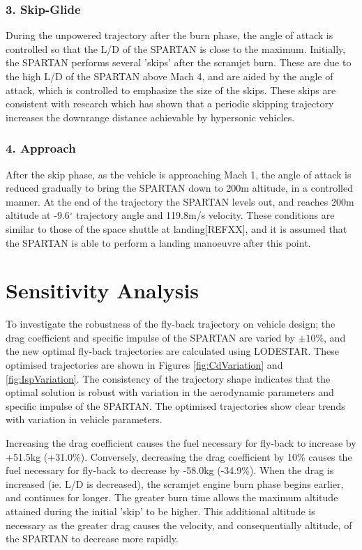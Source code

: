 \documentclass[conf]{new-aiaa}
\begin{document}
\subsubsection{3. Skip-Glide}
During the unpowered trajectory after the burn phase, the angle of attack is controlled so that the L/D of the SPARTAN is close to the maximum. Initially, the SPARTAN performs several 'skips' after the scramjet burn. These are due to the high L/D of the SPARTAN above Mach 4, and are aided by the angle of attack, which is controlled to emphasize the size of the skips. These skips are consistent with research which has shown that a periodic skipping trajectory increases the downrange distance achievable by hypersonic vehicles\cite{Eggers1957,Kanda2007}. 


\subsubsection{4. Approach}
After the skip phase, as the vehicle is approaching Mach 1, the angle of attack is reduced gradually to bring the SPARTAN down to 200m altitude, in a controlled manner. 
 At the end of the trajectory the SPARTAN levels out, and reaches 200m altitude at -9.6$^\circ$ trajectory angle and 119.8m/s velocity. These conditions are similar to those of the space shuttle at landing[REFXX], and it is assumed that the SPARTAN is able to perform a landing manoeuvre after this point. 



 




\section{Sensitivity Analysis}
To investigate the robustness of the fly-back trajectory on vehicle design; the drag coefficient and specific impulse of the SPARTAN are varied by $\pm 10\%$, and the new optimal fly-back trajectories are calculated using LODESTAR. These optimised trajectories are shown in Figures \ref{fig:CdVariation} and \ref{fig:IspVariation}.
The consistency of the trajectory shape indicates that the optimal solution is robust with variation in the aerodynamic parameters and specific impulse of the SPARTAN. The optimised trajectories show clear trends with variation in vehicle parameters.

 Increasing the drag coefficient causes the fuel necessary for fly-back to increase by +51.5kg (+31.0\%). Conversely, decreasing the drag coefficient by 10\% causes the fuel necessary for  fly-back to decrease by -58.0kg (-34.9\%). 
 When the drag is increased (ie. L/D is decreased), the scramjet engine burn phase begins earlier, and continues for longer. 
 The greater burn time allows the maximum altitude attained during the initial 'skip' to be higher. 
 This additional altitude is necessary as the greater drag causes the velocity, and consequentially altitude, of the SPARTAN to decrease more rapidly.
\end{document}
